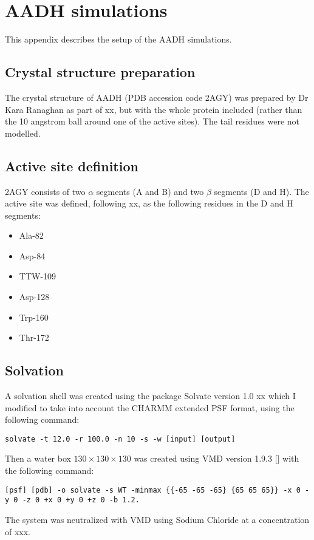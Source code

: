 %
%

\chapter{AADH simulations}
\label{chap:aadh}

This appendix describes the setup of the AADH simulations. 

\section{Crystal structure preparation}
The crystal structure of AADH (PDB accession code 2AGY) was prepared by Dr Kara Ranaghan as part of xx, but with the whole protein included (rather than the 10 angstrom ball around one of the active sites). The tail residues were not modelled. 

\section{Active site definition}
2AGY consists of two $\alpha$ segments (A and B) and two $\beta$ segments (D and H). The active site was defined, following xx, as the following residues in the D and H segments: 
\begin{itemize}
    \item Ala-82
    \item Asp-84
    \item TTW-109
    \item Asp-128
    \item Trp-160
    \item Thr-172
\end{itemize}


\section{Solvation}
A solvation shell was created using the package Solvate version 1.0 xx which I modified to take into account the CHARMM extended PSF format, using the following command:
\begin{lstlisting}
solvate -t 12.0 -r 100.0 -n 10 -s -w [input] [output]
\end{lstlisting}
Then a water box $130 \times 130 \times 130  $  was created using VMD version 1.9.3 [] with the following command: 
\begin{lstlisting}
[psf] [pdb] -o solvate -s WT -minmax {{-65 -65 -65} {65 65 65}} -x 0 -y 0 -z 0 +x 0 +y 0 +z 0 -b 1.2.
\end{lstlisting}
The system was neutralized  with VMD using Sodium Chloride at a concentration of xxx. 


